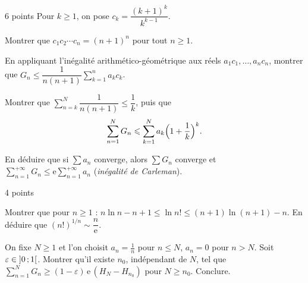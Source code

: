 \begin{exoEval}{6 points}{}
Pour $k\geqslant1$, on pose $c_k=\dfrac{(k+1)^{k}}{k^{k-1}}$.
\begin{questions}[start=7]
  \item Montrer que $c_1c_2\cdots c_n=(n+1)^{n}$ pour tout $n\geqslant1$.
  \item En appliquant l'inégalité arithmético-géométrique aux réels
    $a_1c_1,\dots,a_nc_n$, montrer que
    $G_n\leqslant\dfrac{1}{n(n+1)}\sum_{k=1}^{n}a_kc_k$.
  \item Montrer que $\sum_{n=k}^{N}\dfrac{1}{n(n+1)}\leqslant\dfrac1k$, puis que
    \[\sum_{n=1}^{N}G_n\leqslant\sum_{k=1}^{N}a_k\Bigl(1+\frac1k\Bigr)^{k}.\]
  \item En déduire que si $\sum a_n$ converge, alors $\sum G_n$ converge et
    $\sum_{n=1}^{+\infty}G_n\leqslant\mathrm{e}\sum_{n=1}^{+\infty}a_n$
    (\emph{inégalité de Carleman}).
\end{questions}
\end{exoEval}

\begin{exoEval}{4 points}{}
\begin{questions}[start=11]
  \item Montrer que pour $n\geqslant1$ :
    $n\ln n-n+1\leqslant\ln n!\leqslant(n+1)\ln(n+1)-n$. En déduire que
    $(n!)^{1/n}\sim\dfrac{n}{\mathrm{e}}$.
  \item On fixe $N\geqslant1$ et l'on choisit $a_n=\frac1n$ pour
    $n\leqslant N$, $a_n=0$ pour $n>N$. Soit $\varepsilon\in\mathopen{]}0\,{;}\,1\mathclose{[}$.
    Montrer qu'il existe $n_0$, indépendant de $N$, tel que
    $\sum_{n=1}^{N}G_n\geqslant(1-\varepsilon)\,\mathrm{e}\,(H_N-H_{n_0})$
    pour $N\geqslant n_0$. Conclure.
\end{questions}
\end{exoEval}
